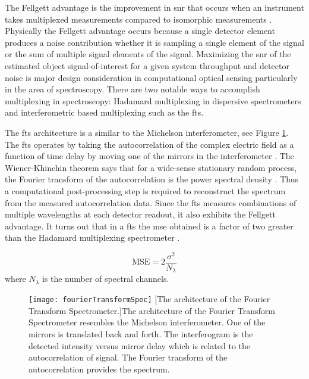 The \gls{Fellgett advantage} is the improvement in \gls{snr} that occurs when an instrument takes multiplexed measurements compared to isomorphic measurements \cite{fellgett1958principes, davis2001fourier}. Physically the \gls{Fellgett advantage}  occurs because a single detector element produces a noise contribution whether it is sampling a single element of the signal or the sum of multiple signal elements of the signal. Maximizing the \acrfull{snr} of the estimated object signal-of-interest for a given system throughput and detector noise is major design consideration in computational optical sensing particularly in the area of spectroscopy. There are two notable ways to accomplish multiplexing in spectroscopy: Hadamard multiplexing in dispersive spectrometers and interferometric based multiplexing such as the \gls{fts}. 

The \gls{fts} architecture is a similar to the Michelson interferometer, see Figure \ref{fig:fourierTransformSpec}. The \gls{fts} operates by taking the autocorrelation of the complex electric field as a function of time delay by moving one of the mirrors in the interferometer \cite{davis2001fourier}. The Wiener-Khinchin theorem says that for a wide-sense stationary random process, the Fourier transform of the autocorrelation is the power spectral density \cite{goodman2015statistical}. Thus a computational post-processing step is required to reconstruct the spectrum from the measured autocorrelation data. Since the \gls{fts} measures combinations of multiple wavelengths at each detector readout, it also exhibits the \gls{Fellgett advantage}. It turns out that in a \gls{fts} the \gls{mse} obtained is a factor of two greater than the Hadamard multiplexing spectrometer \cite{tai1976fourier}. 

\begin{equation}
	\text{MSE} = 2 \frac{\sigma^2}{N_{\lambda}} 
\end{equation}
%
where $N_{\lambda}$ is the number of spectral channels. 
%
\begin{figure}
	\texttt{[image: fourierTransformSpec]}
	[The architecture of the Fourier Transform Spectrometer.]{The architecture of the Fourier Transform Spectrometer resembles the Michelson interferometer. One of the mirrors is translated back and forth. The interferogram is the detected intensity versus mirror delay which is related to the autocorrelation of signal. The Fourier transform of the autocorrelation provides the spectrum.}
	\label{fig:fourierTransformSpec}
\end{figure}

